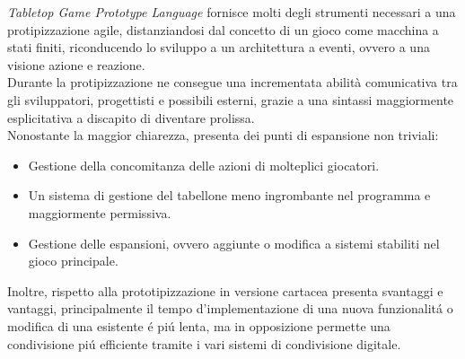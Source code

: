 \textit{Tabletop Game Prototype Language} fornisce molti degli strumenti necessari 
a una protipizzazione agile, distanziandosi dal concetto di un gioco come macchina 
a stati finiti, riconducendo lo sviluppo a un architettura a eventi, ovvero 
a una visione azione e reazione. \\
Durante la protipizzazione ne consegue una incrementata abilità comunicativa tra 
gli sviluppatori, progettisti e possibili esterni, grazie a una sintassi maggiormente
esplicitativa a discapito di diventare prolissa. \\
Nonostante la maggior chiarezza, presenta dei punti di espansione non triviali:
\begin{itemize}
    \item Gestione della concomitanza delle azioni di molteplici giocatori.
    \item { 
        Un sistema di gestione del tabellone meno ingrombante nel programma e
        maggiormente permissiva.
    }
    \item {
        Gestione delle espansioni, ovvero aggiunte o modifica a sistemi stabiliti
        nel gioco principale.
    }
\end{itemize}
Inoltre, rispetto alla prototipizzazione in versione cartacea presenta svantaggi
e vantaggi, principalmente il tempo d'implementazione di una nuova funzionalitá o
modifica di una esistente é piú lenta, ma in opposizione permette 
una condivisione piú efficiente tramite i vari sistemi di condivisione digitale.
